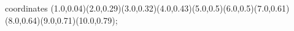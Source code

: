 					coordinates { (1.0,0.04)(2.0,0.29)(3.0,0.32)(4.0,0.43)(5.0,0.5)(6.0,0.5)(7.0,0.61)(8.0,0.64)(9.0,0.71)(10.0,0.79)};